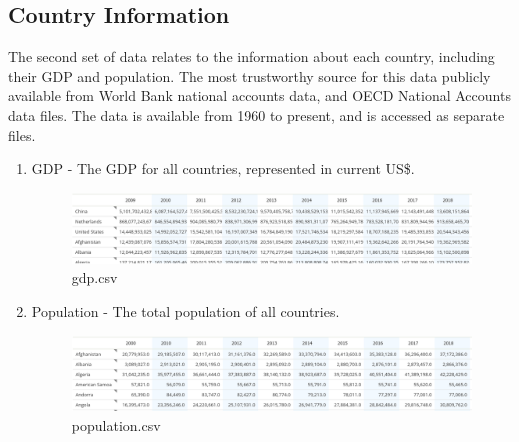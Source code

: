 \documentclass[a4 paper, 12pt]{article}
\begin{document}
    \subsection{Country Information}
    The second set of data relates to the information about each country, including their GDP and population. The most trustworthy source for this data publicly available from World Bank national accounts data, and OECD National Accounts data files. The data is available from 1960 to present, and is accessed as separate files. 
        \begin{enumerate}
            \item GDP - The GDP for all countries, represented in current US\$.
                \begin{figure} [H]
                    \centering
                    \includegraphics[width=\textwidth, frame]
                        {../images/gdp_data.png}
                        \caption{gdp.csv}                    
                \end{figure}
            \item Population - The total population of all countries.
                \begin{figure} [H]
                    \centering
                    \includegraphics[width=\textwidth, frame]
                        {../images/pop_data.png}      
                        \caption{population.csv} 
                \end{figure} 
        \end{enumerate}
\end{document}
